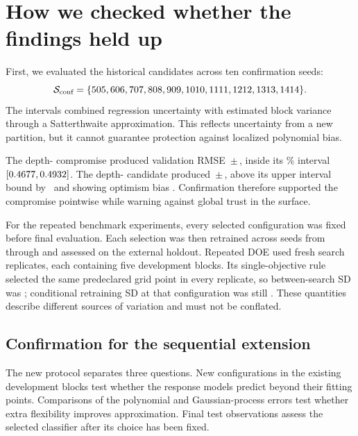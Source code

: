 \documentclass[12pt,a4paper]{article}
\begin{document}
\section{How we checked whether the findings held up}
First, we evaluated the historical candidates across ten confirmation seeds:
\[
\mathcal{S}_{\text{conf}}=\{505, 606, 707, 808, 909, 1010, 1111, 1212, 1313, 1414\}.
\]
The intervals combined regression uncertainty with estimated block variance through a Satterthwaite approximation. This reflects uncertainty from a new partition, but it cannot guarantee protection against localized polynomial bias.
\begin{table}[tbp]
\centering
\small
\setlength{\tabcolsep}{3.2pt}

\caption{Independent confirmation of the historical multi-objective compromise and accuracy-focused boundary candidate. The compromise confirmed within its interval; the boundary candidate exposed polynomial optimism.}
\label{tab:confirmation}
\end{table}

The depth-\numPubDepthMo{} compromise produced validation RMSE \numConfEmpValRMSE\,$\pm$\,\numConfEmpValRMSEStd, inside its \numPubCoveragePct\% interval $[0.4677,0.4932]$. The depth-\numPubDepthSo{} candidate produced \numConfSoEmpValRMSE\,$\pm$\,\numConfSoEmpValRMSEStd, above its upper interval bound by \numConfSoExceedance\ and showing optimism bias \numConfSoBias. Confirmation therefore supported the compromise pointwise while warning against global trust in the surface.

For the repeated benchmark experiments, every selected configuration was fixed before final evaluation. Each selection was then retrained across \numPubEvalSeeds{} seeds from \numPubFirstEvalSeed{} through \numPubLastEvalSeed{} and assessed on the external holdout. Repeated DOE used \numPubSearchReplicates{} fresh search replicates, each containing five development blocks. Its single-objective rule selected the same predeclared grid point in every replicate, so between-search SD was \numRevDoeSoTestRMSESd; conditional retraining SD at that configuration was still \numRevDoeSoRetrainSd. These quantities describe different sources of variation and must not be conflated.

\subsection{Confirmation for the sequential extension}
The new protocol separates three questions. New configurations in the existing development blocks test whether the response models predict beyond their fitting points. Comparisons of the polynomial and Gaussian-process errors test whether extra flexibility improves approximation. Final test observations assess the selected classifier after its choice has been fixed.
\end{document}

